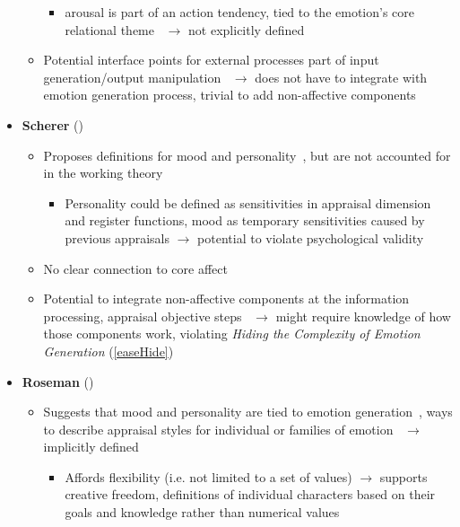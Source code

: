 \begin{itemize}
\begin{itemize}
\begin{itemize}
            \item arousal is part of an action tendency, tied to the
            emotion's core relational theme~\citep[p.~58--59,
            150]{lazarus1991emotion} $\rightarrow$ not explicitly defined
        \end{itemize}

        \item Potential interface points for external processes part of input
        generation/output manipulation~\citep[p.~210]{lazarus1991emotion}
        $\rightarrow$ does not have to integrate with emotion generation
        process, trivial to add non-affective components
    \end{itemize}

    \item \textbf{Scherer} (\weak)
    \begin{itemize}
        \item Proposes definitions for mood and
        personality~\citep[p.~140--141]{scherer2000psychological}, but are not
        accounted for in the working theory~\citep[p.~93,
        119]{scherer2001appraisalB}
        \begin{itemize}
            \item Personality could be defined as sensitivities in appraisal
            dimension and register functions, mood as temporary sensitivities
            caused by previous appraisals $\rightarrow$ potential to violate
            psychological validity
        \end{itemize}

        \item No clear connection to core affect

        \item Potential to integrate non-affective components at the
        information processing, appraisal objective
        steps~\citep[p.~104]{scherer2001appraisalB} $\rightarrow$ might require
        knowledge of how those components work, violating \textit{Hiding the
            Complexity of Emotion Generation} (\ref{easeHide})
    \end{itemize}

    \item \textbf{Roseman} (\weak)
    \begin{itemize}
        \item Suggests that mood and personality are tied to emotion
        generation~\citep[p.~81--83]{roseman2001model}, ways to describe
        appraisal styles for individual or families of
        emotion~\citep[p.~88--89]{roseman2001model} $\rightarrow$ implicitly
        defined
        \begin{itemize}
            \item  Affords flexibility (i.e. not limited to a set of values)
            $\rightarrow$ supports creative freedom, definitions of individual
            characters based on their goals and knowledge rather than numerical
            values


\end{itemize}
\end{itemize}
\end{itemize}
